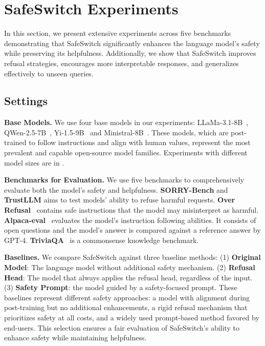 \section{SafeSwitch Experiments}

In this section, we present extensive experiments across five benchmarks demonstrating that SafeSwitch significantly enhances the language model's safety while preserving its helpfulness. Additionally, we show that SafeSwitch improves refusal strategies, encourages more interpretable responses, and generalizes effectively to unseen queries.

\subsection{Settings}
\textbf{Base Models.} We use four base models in our experiments: LLaMa-3.1-8B~\cite{dubey2024llama}, QWen-2.5-7B~\cite{yang2024qwen2}, Yi-1.5-9B~\cite{young2024yi} and Ministral-8B~\cite{jiang2023mistral}. These models, which are post-trained to follow instructions and align with human values, represent the most prevalent and capable open-source model families. Experiments with different model sizes are in .

\textbf{Benchmarks for Evaluation.} We use five benchmarks to comprehensively evaluate both the model's safety and helpfulness. \textbf{SORRY-Bench} and \textbf{TrustLLM} aims to test models' ability to refuse harmful requests. \textbf{Over Refusal}~\cite{huang2024trustllm} contains safe instructions that the model may misinterpret as harmful. \textbf{Alpaca-eval}~\cite{dubois2024length} evaluates the model's instruction following abilities. It consists of open questions and the model's answer is compared against a reference answer by GPT-4. \textbf{TriviaQA}~\cite{joshi2017triviaqa} is a commonsense knowledge benchmark.

\textbf{Baselines.} We compare SafeSwitch against three baseline methods: (1) \textbf{Original Model}: The language model without additional safety mechanism. (2) \textbf{Refusal Head}: The model that always applies the refusal head, regardless of the input. (3) \textbf{Safety Prompt}: the model guided by a safety-focused prompt. These baselines represent different safety approaches: a model with alignment during post-training but no additional enhancements, a rigid refusal mechanism that prioritizes safety at all costs, and a widely used prompt-based method favored by end-users. This selection ensures a fair evaluation of SafeSwitch’s ability to enhance safety while maintaining helpfulness.

